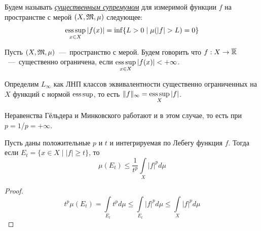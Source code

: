 \begin{definition}
    Будем называть \textit{\underline{существенным супремумом}} для измеримой функции $f$ на пространстве с мерой $(X, \mathfrak{M}, \mu)$ следующее: \[\operatorname*{ess\,sup}\limits_{x \in X}|f(x)| = \inf\{L > 0 \mid \mu(|f| > L) = 0\}\]
\end{definition}
\begin{definition}
    Пусть $(X, \mathfrak{M}, \mu)$~---~пространство с мерой. Будем говорить что $f: X \rightarrow \overline{\mathbb{R}}$~---~существенно ограничена, если $\operatorname*{ess\,sup}\limits_{x \in X} |f(x)| < +\infty$.
\end{definition}
\begin{definition}
    Определим $L_\infty$ как ЛНП классов эквивалентности существенно ограниченных на $X$ функций с нормой $\operatorname*{ess\,sup}$, то есть $\|f\|_\infty = \operatorname*{ess\,sup}\limits_X |f|$.
\end{definition}
\begin{note}
    Неравенства Гёльдера и Минковского работают и в этом случае, то есть при $p = 1$/$p = +\infty$.
\end{note}

\begin{theorem}
    Пусть даны положительные $p$ и $t$ и интегрируемая по Лебегу функция $f$. Тогда если $E_t = \{x \in X \mid |f| \geq t\}$, то \[\mu(E_t) \leq \frac{1}{t^p}\int\limits_X |f|^pd\mu\]
\end{theorem}
\begin{proof}
    \[t^p\mu(E_t) = \int\limits_{E_t} t^pd\mu \leq \int\limits_{E_t} |f|^pd\mu \leq \int\limits_{X}|f|^pd\mu\]
\end{proof}